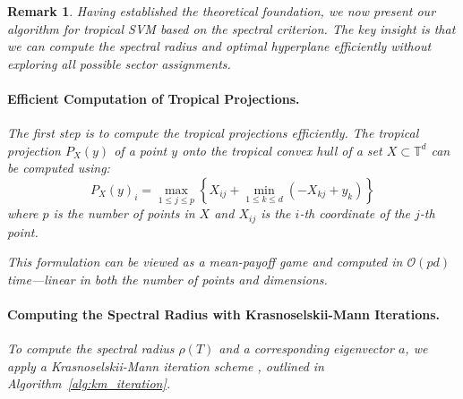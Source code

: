 \documentclass{article}
\newtheorem{remark}{Remark}
\newcommand{\trop}{\mathbb{T}}
\begin{document}
\begin{remark}
Having established the theoretical foundation, we now present our algorithm for tropical SVM based on the spectral criterion. The key insight is that we can compute the spectral radius and optimal hyperplane efficiently without exploring all possible sector assignments.

\paragraph{Efficient Computation of Tropical Projections.}
\label{subsec:computing_projections}
The first step is to compute the tropical projections efficiently. The tropical projection $P_X(y)$ of a point $y$ onto the tropical convex hull of a set $X \subset \trop^d$ can be computed using:
\[
P_X(y)_i = \max_{1 \leq j \leq p} \left\{X_{ij} + \min_{1 \leq k \leq d} \left(-X_{kj} + y_k\right)\right\}
\]
where $p$ is the number of points in $X$ and $X_{ij}$ is the $i$-th coordinate of the $j$-th point.

This formulation can be viewed as a mean-payoff game \cite{akian2020} and computed in $\mathcal{O}(pd)$ time—linear in both the number of points and dimensions.

\paragraph{Computing the Spectral Radius with Krasnoselskii-Mann Iterations.}
\label{subsec:spectral_computation}
To compute the spectral radius $\rho(T)$ and a corresponding eigenvector $a$, we apply a Krasnoselskii-Mann iteration scheme \cite{nussbaum1986, gaubert2004}, outlined in Algorithm~\ref{alg:km_iteration}.


\end{remark}
\end{document}
